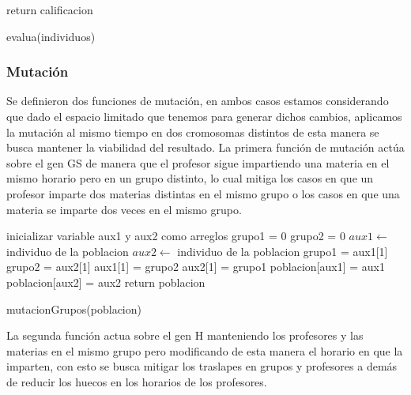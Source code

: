\begin{algorithm}
	\setcounter{AlgoLine}{44}
	\SetAlgoVlined
	return calificacion\;	
	\caption{evalua(individuos)}
\end{algorithm}

\subsubsection{Mutaci\'on}

Se definieron dos funciones de mutación, en ambos casos estamos considerando que dado el espacio limitado que tenemos para generar dichos cambios, aplicamos la mutación al mismo tiempo en dos cromosomas distintos de esta manera se busca mantener la viabilidad del resultado. La primera función de mutación  actúa sobre el gen GS de manera que el profesor sigue impartiendo una materia en el mismo horario pero en un grupo distinto, lo cual mitiga los casos en que un profesor imparte dos materias distintas en el mismo grupo o los casos en que una materia se imparte dos veces en el mismo grupo.\\ 


\begin{algorithm}[H]
	\DontPrintSemicolon
	\SetAlgoLined
	inicializar variable aux1 y aux2 como arreglos\;
	grupo1 = 0\;
	grupo2 = 0\;
	$aux1 \leftarrow $ individuo de la poblacion\;
	$aux2 \leftarrow $ individuo de la poblacion\;
	grupo1 = aux1[1]\;
	grupo2 = aux2[1]\;
	aux1[1] = grupo2\;
	aux2[1] = grupo1\;
	poblacion[aux1] = aux1\;
	poblacion[aux2] = aux2\;
	return poblacion \;
	\caption{mutacionGrupos(poblacion)}
\end{algorithm}

La segunda función actua sobre el gen H manteniendo los profesores y las materias en el mismo grupo pero modificando de esta manera el horario en que la imparten, con esto se busca mitigar los traslapes en grupos y profesores a demás de reducir los huecos en los horarios de los profesores.\\


